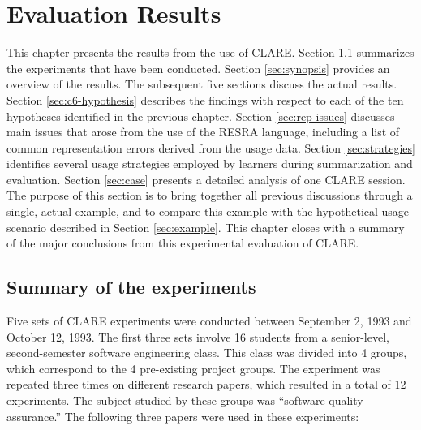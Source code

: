 
\setcounter{chapter}{5}
\chapter{Evaluation Results}
\label{sec:results}

This chapter presents the results from the use of CLARE. Section
\ref{sec:c6-overview} summarizes the experiments that have been conducted.
Section \ref{sec:synopsis} provides an overview of the results. The
subsequent five sections discuss the actual results. Section
\ref{sec:c6-hypothesis} describes the findings with respect to each of the
ten hypotheses identified in the previous chapter.  Section
\ref{sec:rep-issues} discusses main issues that arose from the use of the
RESRA language, including a list of common representation errors derived
from the usage data. Section \ref{sec:strategies} identifies several usage
strategies employed by learners during summarization and evaluation.
Section \ref{sec:case} presents a detailed analysis of one CLARE session.
The purpose of this section is to bring together all previous discussions
through a single, actual example, and to compare this example with the
hypothetical usage scenario described in Section \ref{sec:example}. This
chapter closes with a summary of the major conclusions from this
experimental evaluation of CLARE.


\section{Summary of the experiments}
\label{sec:c6-overview}

Five sets of CLARE experiments were conducted between September 2, 1993 and
October 12, 1993. The first three sets involve 16 students from a
senior-level, second-semester software engineering class. This class was
divided into 4 groups, which correspond to the 4 pre-existing project
groups. The experiment was repeated three times on different research
papers, which resulted in a total of 12 experiments.  The subject studied
by these groups was ``software quality assurance.'' The following three
papers were used in these experiments:

